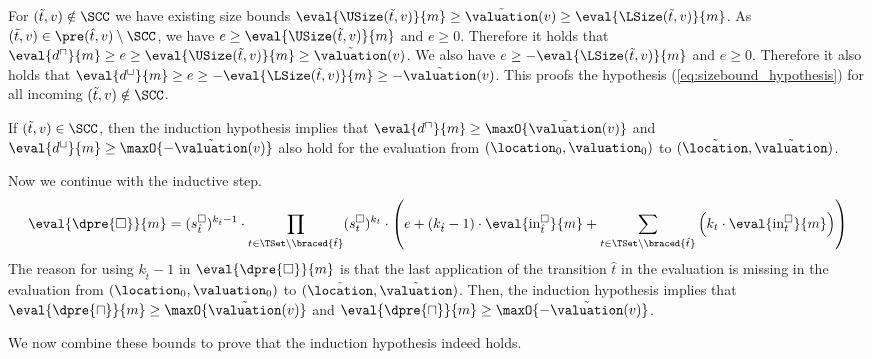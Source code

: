 For $(\tilde{t}, v) \notin \SCC$ we have existing size bounds $\eval{\USize(\tilde{t}, v)}{m} \geq \tilde{\valuation}(v) \geq \eval{\LSize(\tilde{t}, v)}{m}$.
As $(\tilde{t}, v) \in \pre(\hat{t}, v) \setminus \SCC$, we have $e \geq \eval{\USize(\tilde{t}, v)}{m}$ and $e \geq 0$.
Therefore it holds that $\eval{d^\sqcap}{m} \geq e \geq \eval{\USize(\tilde{t}, v)}{m} \geq \tilde{\valuation}(v)$.
We also have $e \geq -\eval{\LSize(\tilde{t}, v)}{m}$ and $e \geq 0$.
Therefore it also holds that $\eval{d^\sqcup}{m} \geq e \geq -\eval{\LSize(\tilde{t}, v)}{m} \geq -\tilde{\valuation}(v)$.
This proofs the hypothesis (\ref{eq:sizebound_hypothesis}) for all incoming $(\tilde{t}, v) \notin \SCC$.

If $(\tilde{t}, v) \in \SCC$, then the induction hypothesis implies that $\eval{d^\sqcap}{m} \geq \maxO{\tilde{\valuation}(v)}$ and $\eval{d^\sqcup}{m} \geq \maxO{-\tilde{\valuation}(v)}$ also hold for the evaluation from $(\location_0, \valuation_0)$ to $(\tilde{\location}, \tilde{\valuation})$.

Now we continue with the inductive step.
\begin{equation} \label{eq:induction_consequence}
  \eval{\dpre{\square}}{m} = (s^\square_{\hat{t}})^{k_{\hat{t}} - 1} \cdot \prod_{t \in \TSet \setminus \braced{\hat{t}}} (s^\square_t)^{k_t} \cdot \left( e + \left( k_{\hat{t}} - 1 \right) \cdot \eval{\text{in}^\square_{\hat{t}}}{m} + \sum_{t \in \TSet \setminus \braced{\hat{t}}} \left( k_t \cdot \eval{\text{in}^\square_t}{m} \right) \right)
\end{equation}
The reason for using $k_{\hat{t}} - 1$ in $\eval{\dpre{\square}}{m}$ is that the last application of the transition $\hat{t}$ in the evaluation is missing in the evaluation from $(\location_0, \valuation_0)$ to $(\tilde{\location}, \tilde{\valuation})$.
Then, the induction hypothesis implies that $\eval{\dpre{\sqcap}}{m} \geq \maxO{\tilde{\valuation}(v)}$ and $\eval{\dpre{\sqcap}}{m} \geq \maxO{-\tilde{\valuation}(v)}$.

We now combine these bounds to prove that the induction hypothesis indeed holds.


